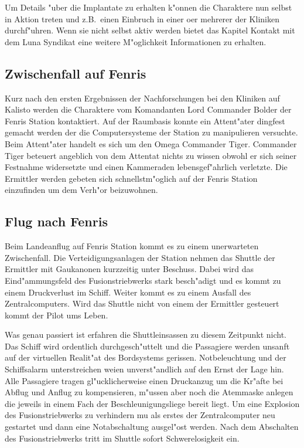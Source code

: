 \begin{remarks}
Um Details "uber die Implantate zu erhalten k"onnen die Charaktere nun selbst in Aktion treten und z.B.~einen Einbruch in einer oer mehrerer der Kliniken durchf"uhren. Wenn sie nicht selbst aktiv werden bietet das Kapitel Kontakt mit dem Luna Syndikat eine weitere M"oglichkeit Informationen zu erhalten.
\end{remarks}


\subsection{Zwischenfall auf Fenris}

Kurz nach den ersten Ergebnissen der Nachforschungen bei den Kliniken auf Kalisto werden die Charaktere vom Komandanten Lord Commander Bolder der Fenris Station kontaktiert. Auf der Raumbasis konnte ein Attent"ater dingfest gemacht werden der die Computersysteme der Station zu manipulieren versuchte. Beim Attent"ater handelt es sich um den Omega Commander Tiger. Commander Tiger beteuert angeblich von dem Attentat nichts zu wissen obwohl er sich seiner Festnahme widersetzte und einen Kammeraden lebensgef"ahrlich verletzte. Die Ermittler werden gebeten sich schnellstm"oglich auf der Fenris Station einzufinden um dem Verh"or beizuwohnen.

\subsection{Flug nach Fenris}

Beim Landeanflug auf Fenris Station kommt es zu einem unerwarteten Zwischenfall. Die Verteidigungsanlagen der Station nehmen das Shuttle der Ermittler mit Gau\3kanonen kurzzeitig unter Beschuss. Dabei wird das Eind"ammungsfeld des Fusionstriebwerks stark besch"adigt und es kommt zu einem Druckverlust im Schiff. Weiter kommt es zu einem Ausfall des Zentralcomputers. Wird das Shuttle nicht von einem der Ermittler gesteuert kommt der Pilot ums Leben.

Was genau passiert ist erfahren die Shuttleinsassen zu diesem Zeitpunkt nicht. Das Schiff wird ordentlich durchgesch"uttelt und die Passagiere werden unsanft auf der virtuellen Realit"at des Bordsystems gerissen. Notbeleuchtung und der Schiffsalarm unterstreichen wei\3en unverst"andlich auf den Ernst der Lage hin. Alle Passagiere tragen gl"ucklicherweise einen Druckanzug um die Kr"afte bei Abflug und Anflug zu kompensieren, m"ussen aber noch die Atemmaske anlegen die jeweils in einem Fach der Beschleunigungsliege bereit liegt. Um eine Explosion des Fusionstriebwerks zu verhindern mu\3 als erstes der Zentralcomputer neu gestartet und dann eine Notabschaltung ausgel"ost werden. Nach dem Abschalten des Fusionstriebwerks tritt im Shuttle sofort Schwerelosigkeit ein.

